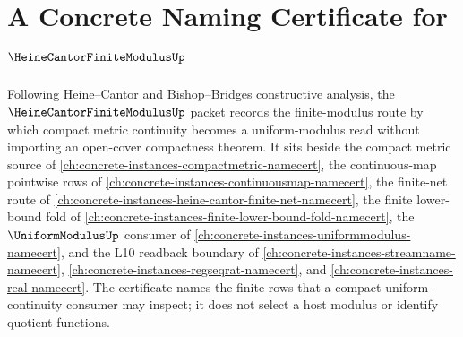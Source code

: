\chapter{A Concrete Naming Certificate for $\HeineCantorFiniteModulusUp$}
\label{ch:concrete-instances-heine-cantor-finite-modulus-namecert}

Following Heine--Cantor and Bishop--Bridges constructive analysis, the $\HeineCantorFiniteModulusUp$ packet records the finite-modulus route by which compact metric continuity becomes a uniform-modulus read without importing an open-cover compactness theorem. It sits beside the compact metric source of \autoref{ch:concrete-instances-compactmetric-namecert}, the continuous-map pointwise rows of \autoref{ch:concrete-instances-continuousmap-namecert}, the finite-net route of \autoref{ch:concrete-instances-heine-cantor-finite-net-namecert}, the finite lower-bound fold of \autoref{ch:concrete-instances-finite-lower-bound-fold-namecert}, the $\UniformModulusUp$ consumer of \autoref{ch:concrete-instances-uniformmodulus-namecert}, and the L10 readback boundary of \autoref{ch:concrete-instances-streamname-namecert}, \autoref{ch:concrete-instances-regseqrat-namecert}, and \autoref{ch:concrete-instances-real-namecert}. The certificate names the finite rows that a compact-uniform-continuity consumer may inspect; it does not select a host modulus or identify quotient functions.

